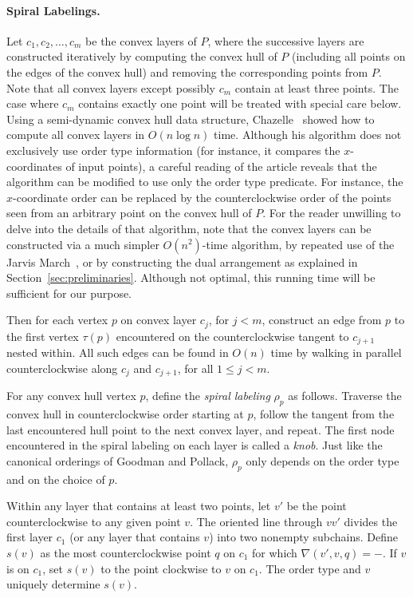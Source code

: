 \documentclass[leqno,12pt]{article}
\begin{document}
\paragraph{Spiral Labelings.}
Let $c_1, c_2, \ldots, c_m$ be the convex layers of $P$, where the
successive layers are constructed iteratively by computing the convex
hull of $P$ (including all points on the edges of the convex hull) and
removing the corresponding points from $P$.  Note that all convex
layers except possibly $c_m$ contain at least three points. The case
where $c_m$ contains exactly one point will be treated with special care below.
Using a semi-dynamic convex hull data structure, 
Chazelle~\cite{chazelle_85_convex_layers} showed
how to compute all convex layers in $O(n \log n)$ time. Although his
algorithm does not exclusively use  order type information (for
instance, it compares the $x$-coordinates of input points), a careful reading of
the article reveals that the algorithm can be modified to use only the
order type predicate. For instance, the $x$-coordinate order can be
replaced by the counterclockwise order of the points seen from an
arbitrary point on the convex hull of $P$. 
For the reader unwilling to delve into the details of that algorithm,
note that 
the convex layers can be constructed 
via a much simpler $O(n^2)$-time algorithm, 
by repeated use of the Jarvis March~\cite{Jarvis197318},
or by constructing the dual arrangement as explained in
Section~\ref{sec:preliminaries}.  
Although not optimal, this  running time will be sufficient for our purpose.

Then for each vertex $p$ on convex layer $c_j$,  for $j<m$, construct an edge
from $p$ 
to the first vertex $\tau(p)$ encountered on the counterclockwise tangent to
$c_{j+1}$ nested within. 
All such edges can be found in $O(n)$ time by
walking in parallel counterclockwise along $c_j$ and $c_{j+1}$, for
all $1\leq j < m$. 

For any convex hull vertex $p$, define the \emph{spiral
  labeling} $\rho_p$ as follows.
Traverse the convex hull in counterclockwise order starting at $p$, 
follow the tangent from the last encountered hull point to the next convex layer, and repeat. 
The first node encountered 
in
 the spiral labeling on each layer is
called a \emph{knob}.
Just like
the canonical orderings of Goodman and Pollack,  $\rho_p$ only depends on the
order type and
on
 the choice of
 $p$.
 

Within any layer that contains at least two points,
let $v'$ be the point counterclockwise to any given point $v$.
The oriented line through
$vv'$
 divides the first layer $c_1$ (or any layer that contains $v$) into two
nonempty subchains. Define 
$s(v)$   
as the most counterclockwise point $q$
on $c_1$ for which 
$\nabla(v',v,q)=-$.
If $v$ is 
 on $c_1$, set
$s(v)$
 to the point clockwise to 
 $v$
on $c_1$.
The order type and $v$ uniquely determine $s(v)$.
\end{document}
